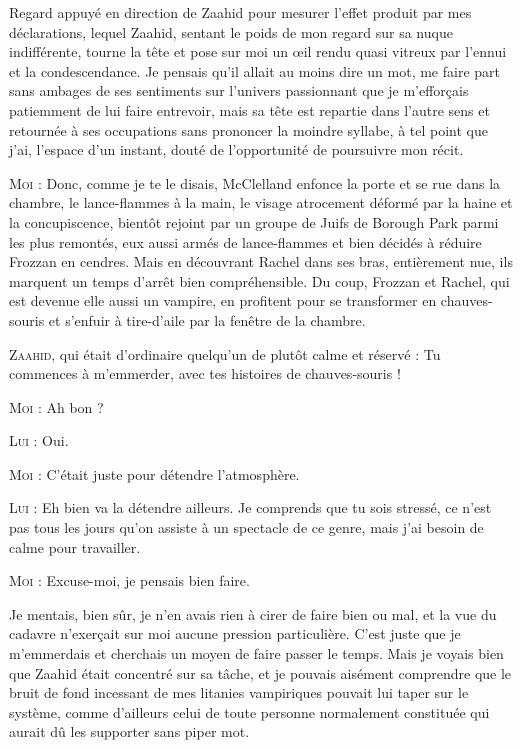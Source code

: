 Regard appuyé en direction de Zaahid pour mesurer l’effet produit par mes déclarations, lequel Zaahid, sentant le poids de mon regard sur sa nuque indifférente, tourne la tête et pose sur moi un œil rendu quasi vitreux par l’ennui et la condescendance. Je pensais qu’il allait au moins dire un mot, me faire part sans ambages de ses sentiments sur l’univers passionnant que je m’efforçais patiemment de lui faire entrevoir, mais sa tête est repartie dans l’autre sens et retournée à ses occupations sans prononcer la moindre syllabe, à tel point que j’ai, l’espace d’un instant, douté de l’opportunité de poursuivre mon récit.

\begin{dialogue}

\textsc{Moi} : Donc, comme je te le disais, McClelland enfonce la porte et se rue dans la chambre, le lance-flammes à la main, le visage atrocement déformé par la haine et la concupiscence, bientôt rejoint par un groupe de Juifs de Borough Park parmi les plus remontés, eux aussi armés de lance-flammes et bien décidés à réduire Frozzan en cendres. Mais en découvrant Rachel dans ses bras, entièrement nue, ils marquent un temps d’arrêt bien compréhensible. Du coup, Frozzan et Rachel, qui est devenue elle aussi un vampire, en profitent pour se transformer en chauves-souris et s’enfuir à tire-d’aile par la fenêtre de la chambre.

\textsc{Zaahid}, qui était d’ordinaire quelqu’un de plutôt calme et réservé : Tu commences à m’emmerder, avec tes histoires de chauves-souris !

\textsc{Moi} : Ah bon ?

\textsc{Lui} : Oui.

\textsc{Moi} : C’était juste pour détendre l’atmosphère.

\textsc{Lui} : Eh bien va la détendre ailleurs. Je comprends que tu sois stressé, ce n’est pas tous les jours qu’on assiste à un spectacle de ce genre, mais j’ai besoin de calme pour travailler.

\textsc{Moi} : Excuse-moi, je pensais bien faire.

\end{dialogue}

Je mentais, bien sûr, je n’en avais rien à cirer de faire bien ou mal, et la vue du cadavre n’exerçait sur moi aucune pression particulière. C’est juste que je m’emmerdais et cherchais un moyen de faire passer le temps. Mais je voyais bien que Zaahid était concentré sur sa tâche, et je pouvais aisément comprendre que le bruit de fond incessant de mes litanies vampiriques pouvait lui taper sur le système, comme d’ailleurs celui de toute personne normalement constituée qui aurait dû les supporter sans piper mot.

